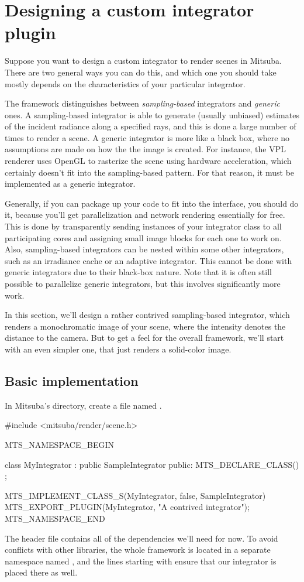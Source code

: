 \section{Designing a custom integrator plugin}
Suppose you want to design a custom integrator to render scenes in Mitsuba.
There are two general ways you can do this, and which one you should take
mostly depends on the characteristics of your particular integrator.

The framework distinguishes between \emph{sampling-based} integrators and 
\emph{generic} ones. A sampling-based integrator is able to generate 
(usually unbiased) estimates of the incident radiance along a specified rays, and this 
is done a large number of times to render a scene. A generic integrator
is more like a black box, where no assumptions are made on how the the image is
created. For instance, the VPL renderer uses OpenGL to rasterize the scene
using hardware acceleration, which certainly doesn't fit into the sampling-based pattern.
For that reason, it must be implemented as a generic integrator.

Generally, if you can package up your code to fit into the
 interface, you should do it, because you'll get
parallelization and network rendering essentially for free. This is done
by transparently sending instances of your integrator class to all participating cores
and assigning small image blocks for each one to work on. Also, sampling-based
integrators can be nested within some other integrators, such as an
irradiance cache or an adaptive integrator. This cannot be done with generic
integrators due to their black-box nature. Note that it is often still 
possible to parallelize generic integrators, but this involves significantly 
more work.

In this section, we'll design a rather contrived sampling-based integrator, 
which renders a monochromatic image of your scene, where the intensity 
denotes the distance to the camera. But to get a feel for the overall 
framework, we'll start with an even simpler one, that just renders a 
solid-color image.

\subsection{Basic implementation}
In Mitsuba's  directory, create a file named 
. 

\begin{cpp}
#include <mitsuba/render/scene.h>

MTS_NAMESPACE_BEGIN

class MyIntegrator : public SampleIntegrator {
public:
	MTS_DECLARE_CLASS()
};

MTS_IMPLEMENT_CLASS_S(MyIntegrator, false, SampleIntegrator)
MTS_EXPORT_PLUGIN(MyIntegrator, "A contrived integrator");
MTS_NAMESPACE_END
\end{cpp}
The  header file contains all of the dependencies we'll need
for now.
To avoid conflicts with other libraries, the whole framework is located in
a separate namespace named , and the lines starting with 
 ensure that our integrator is placed there
as well.

